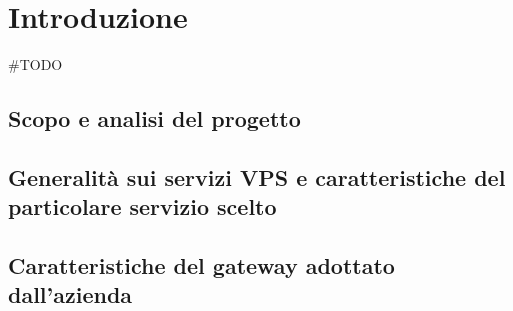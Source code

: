 \chapter{Introduzione}
\setlength{\parskip}{1em}
\setlength{\parindent}{0em}
\renewcommand{\baselinestretch}{1.15}

\#TODO

\section{Scopo e analisi del progetto} \label{Scopo_e_analisi_del_progetto}


\section{Generalità sui servizi VPS e caratteristiche del particolare servizio scelto }\label{caratteristiche_vps}


\section{Caratteristiche del gateway adottato dall'azienda }\label{caratteristiche_gateway}

